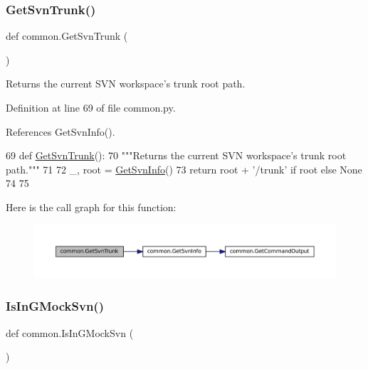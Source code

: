 \subsubsection{\texorpdfstring{Get\+Svn\+Trunk()}{GetSvnTrunk()}}
{\footnotesize\ttfamily def common.\+Get\+Svn\+Trunk (\begin{DoxyParamCaption}{ }\end{DoxyParamCaption})}

\begin{DoxyVerb}Returns the current SVN workspace's trunk root path.\end{DoxyVerb}
 

Definition at line 69 of file common.\+py.



References Get\+Svn\+Info().


\begin{DoxyCode}
69 \textcolor{keyword}{def }\hyperlink{namespacecommon_a9e6483972a8dc0a6a274cbcee69564b0}{GetSvnTrunk}():
70   \textcolor{stringliteral}{"""Returns the current SVN workspace's trunk root path."""}
71 
72   \_, root = \hyperlink{namespacecommon_a312d07161b76d965fee6a61e464e283f}{GetSvnInfo}()
73   \textcolor{keywordflow}{return} root + \textcolor{stringliteral}{'/trunk'} \textcolor{keywordflow}{if} root \textcolor{keywordflow}{else} \textcolor{keywordtype}{None}
74 
75 
\end{DoxyCode}
Here is the call graph for this function\+:
\nopagebreak
\begin{figure}[H]
\begin{center}
\leavevmode
\includegraphics[width=350pt]{namespacecommon_a9e6483972a8dc0a6a274cbcee69564b0_cgraph}
\end{center}
\end{figure}
\mbox{\label{namespacecommon_a8219bb529336fc3f0ef8222a5ed48222}} 
\subsubsection{\texorpdfstring{Is\+In\+G\+Mock\+Svn()}{IsInGMockSvn()}}
{\footnotesize\ttfamily def common.\+Is\+In\+G\+Mock\+Svn (\begin{DoxyParamCaption}{ }\end{DoxyParamCaption})}




